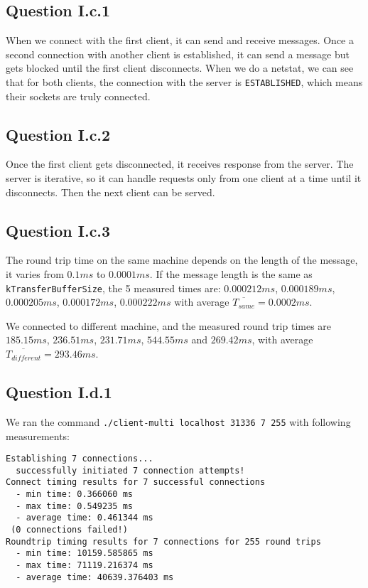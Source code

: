 \subsection*{Question I.c.1}
When we connect with the first client, it can send and receive messages. Once a second connection with another client is established, it can send a message but gets blocked until the first client disconnects. When we do a netstat, we can see that for both clients, the connection with the server is \texttt{ESTABLISHED}, which means their sockets are truly connected.

\subsection*{Question I.c.2}
Once the first client gets disconnected, it receives response from the server. The server is iterative, so it can handle requests only from one client at a time until it disconnects. Then the next client can be served.

\subsection*{Question I.c.3}
The round trip time on the same machine depends on the length of the message, it varies from $0.1ms$ to $0.0001ms$. If the message length is the same as \texttt{kTransferBufferSize}, the 5 measured times are:
$0.000212 ms$, $0.000189 ms$, $0.000205 ms$, $0.000172 ms$, $0.000222 ms$ with average $\overline{T_{same}} = 0.0002 ms$.

We connected to different machine, and the measured round trip times are $185.15 ms$, $236.51 ms$, $231.71 ms$, $544.55 ms$ and $269.42 ms$, with average $\overline{T_{different}} = 293.46 ms$.

\subsection*{Question I.d.1}
We ran the command \texttt{./client-multi localhost 31336 7 255} with following measurements:
\begin{verbatim}
Establishing 7 connections... 
  successfully initiated 7 connection attempts!
Connect timing results for 7 successful connections
  - min time: 0.366060 ms
  - max time: 0.549235 ms
  - average time: 0.461344 ms
 (0 connections failed!)
Roundtrip timing results for 7 connections for 255 round trips
  - min time: 10159.585865 ms
  - max time: 71119.216374 ms
  - average time: 40639.376403 ms
\end{verbatim}

